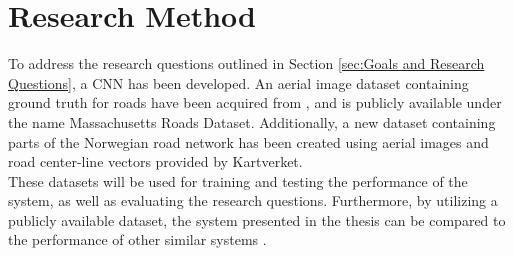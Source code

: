 \section{Research Method}
\label{sec:researchMethod}
To address the research questions outlined in Section \ref{sec:Goals and Research Questions}, a \ac{CNN} has been developed. An aerial image dataset containing ground truth for roads have been acquired from \citep{MnihThesis}, and is publicly available under the name Massachusetts Roads Dataset. Additionally, a new dataset containing parts of the Norwegian road network has been created using aerial images and road center-line vectors provided by Kartverket.\\   

These datasets will be used for training and testing the performance of the system, as well as evaluating the research questions. Furthermore, by utilizing a publicly available dataset, the system presented in the thesis can be compared to the performance of other similar systems \citep{MnihThesis}\citep{saito_building_and_roads}.  